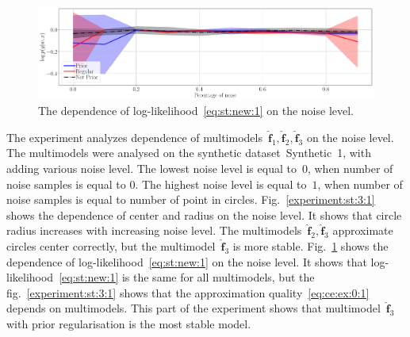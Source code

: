 \documentclass[12pt, twoside]{article}
\numberwithin{equation}{section}
\begin{document}
\begin{figure}[h!t]\center
\includegraphics[width=1\textwidth]{result_eng/experiment_synt_likelihood_progress_noise}
\caption{The dependence of log-likelihood~\eqref{eq:st:new:1} on the noise level.}
\label{experiment:st:3:2}
\end{figure}

The experiment analyzes dependence of multimodels~$\hat{\mathbf{f}}_1, \hat{\mathbf{f}}_2, \hat{\mathbf{f}}_3$ on the noise level. 
The multimodels were analysed on the synthetic dataset~Synthetic~1, with adding various noise level.
The lowest noise level is equal to~$0$, when number of noise samples is equal to $0$. The highest noise level is equal to~$1$, when number of noise samples is equal to number of point in circles.
Fig.~\ref{experiment:st:3:1} shows the dependence of center and radius on the noise level. It shows that circle radius increases with increasing noise level. 
The multimodels~$\hat{\mathbf{f}}_2, \hat{\mathbf{f}}_3$ approximate circles center correctly, but the multimodel~$ \hat{\mathbf{f}}_3$ is more stable.
Fig.~\ref{experiment:st:3:2} shows the dependence of log-likelihood~\eqref{eq:st:new:1} on the noise level. 
It shows that log-likelihood~\eqref{eq:st:new:1} is the same for all multimodels, but the fig.~\ref{experiment:st:3:1} shows that the approximation quality~\eqref{eq:ce:ex:0:1} depends on multimodels.
This part of the experiment shows that multimodel~$\hat{\mathbf{f}}_3$ with prior regularisation is the most stable model.
\end{document}

